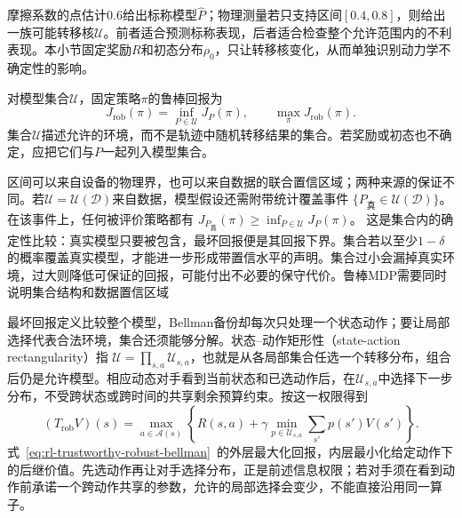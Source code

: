 摩擦系数的点估计0.6给出标称模型$\widehat P$；物理测量若只支持区间$[0.4,0.8]$，则给出一族可能转移核$\mathcal U$。前者适合预测标称表现，后者适合检查整个允许范围内的不利表现。本小节固定奖励$R$和初态分布$\rho_0$，只让转移核变化，从而单独识别动力学不确定性的影响。

\begin{definition}[最坏情形回报]
  \label{def:rl-trustworthy-robust-return}
  对模型集合$\mathcal U$，固定策略$\pi$的鲁棒回报为
  \[
    J_{\mathrm{rob}}(\pi)=\inf_{P\in\mathcal U}J_P(\pi),
    \qquad \max_\pi J_{\mathrm{rob}}(\pi).
  \]
  集合$\mathcal U$描述允许的环境，而不是轨迹中随机转移结果的集合。若奖励或初态也不确定，应把它们与$P$一起列入模型集合。
\end{definition}

区间可以来自设备的物理界，也可以来自数据的联合置信区域；两种来源的保证不同。若$\mathcal U=\mathcal U(\mathcal D)$来自数据，模型假设还需附带统计覆盖事件
$\{P_{\text{真}}\in\mathcal U(\mathcal D)\}$。在该事件上，任何被评价策略都有
$J_{P_{\text{真}}}(\pi)\geq\inf_{P\in\mathcal U}J_P(\pi)$。
这是集合内的确定性比较：真实模型只要被包含，最坏回报便是其回报下界。集合若以至少$1-\delta$的概率覆盖真实模型，才能进一步形成带置信水平的声明。集合过小会漏掉真实环境，过大则降低可保证的回报，可能付出不必要的保守代价。鲁棒MDP需要同时说明集合结构和数据置信区域

最坏回报定义比较整个模型，Bellman备份却每次只处理一个状态动作；要让局部选择代表合法环境，集合还须能够分解。状态--动作矩形性（state-action rectangularity）指
$\mathcal U=\prod_{s,a}\mathcal U_{s,a}$，也就是从各局部集合任选一个转移分布，组合后仍是允许模型。相应动态对手看到当前状态和已选动作后，在$\mathcal U_{s,a}$中选择下一步分布，不受跨状态或跨时间的共享剩余预算约束。按这一权限得到
\begin{equation}
  (T_{\mathrm{rob}}V)(s)
    =\max_{a\in\mathcal A(s)}
      \left\{R(s,a)+\gamma
        \min_{p\in\mathcal U_{s,a}}\sum_{s'}p(s')V(s')\right\}.
  \label{eq:rl-trustworthy-robust-bellman}
\end{equation}
式~\eqref{eq:rl-trustworthy-robust-bellman}~的外层最大化回报，内层最小化给定动作下的后继价值。先选动作再让对手选择分布，正是前述信息权限；若对手须在看到动作前承诺一个跨动作共享的参数，允许的局部选择会变少，不能直接沿用同一算子。

